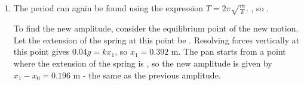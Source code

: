 \begin{problem}[A1951PIQ3p]
{\begin{enumerate}
\nl Angular frequency $\omega = \sqrt{\frac{k}{m}}$, and period $T = \frac{2\pi}{\omega}$, so $T = 2\pi\sqrt{\frac{m}{k}}$. If  $=$ , then $T = 2\pi\sqrt{\frac{0.02}{1}} = 0.889$ s.

\nl The pan starts at a height with the spring unstretched, and then oscillates about a point where the extension is . The amplitude of the motion is therefore equal to this equilibrium extension. $0.02g = kx_0$, so $x_0 = \frac{0.02g}{k} = 0.196$ m.


	\item The period can again be found using the expression $T = 2\pi\sqrt{\frac{m}{k}}$. , so .
	
\nl To find the new amplitude, consider the equilibrium point of the new motion. Let the extension of the spring at this point be . Resolving forces vertically at this point gives $0.04g = kx_1$, so $x_1 = 0.392$ m. The pan starts from a point where the extension of the spring is , so the new amplitude is given by $x_1-x_0 = 0.196$ m - the same as the previous amplitude.



\end{enumerate}
}
\end{problem}